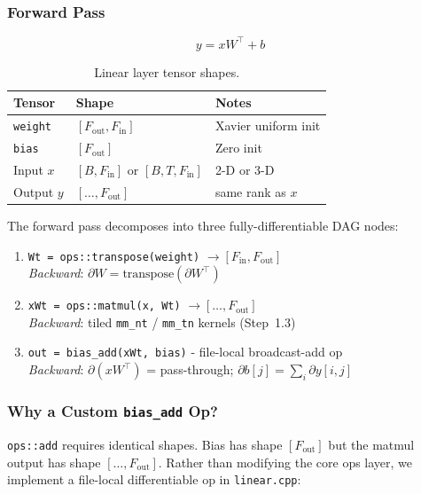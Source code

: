 \documentclass[12pt, a4paper]{article}
\begin{document}
\subsubsection{Forward Pass}

\[
  y = x W^{\top} + b
\]

\begin{table}[!ht]
\centering
\renewcommand{\arraystretch}{1.35}
\begin{tabularx}{\textwidth}{@{} l l L @{}}
\toprule
\textbf{Tensor} & \textbf{Shape} & \textbf{Notes} \\
\midrule
\texttt{weight} & \([F_{\text{out}}, F_{\text{in}}]\)  & Xavier uniform init \\
\texttt{bias}   & \([F_{\text{out}}]\)                  & Zero init \\
Input \(x\)     & \([B, F_{\text{in}}]\) or \([B,T,F_{\text{in}}]\) & 2-D or 3-D \\
Output \(y\)    & \([\ldots, F_{\text{out}}]\)          & same rank as \(x\) \\
\bottomrule
\end{tabularx}
\caption{Linear layer tensor shapes.}
\end{table}

The forward pass decomposes into three fully-differentiable DAG nodes:

\begin{enumerate}
  \item \texttt{Wt = ops::transpose(weight)} \(\rightarrow [F_{\text{in}}, F_{\text{out}}]\) \\
        \textit{Backward}: \(\partial W = \text{transpose}(\partial W^{\top})\)
  \item \texttt{xWt = ops::matmul(x, Wt)} \(\rightarrow [\ldots, F_{\text{out}}]\) \\
        \textit{Backward}: tiled \texttt{mm\_nt} / \texttt{mm\_tn} kernels (Step~1.3)
  \item \texttt{out = bias\_add(xWt, bias)} - file-local broadcast-add op \\
        \textit{Backward}: \(\partial(xW^{\top})\) = pass-through; \quad
        \(\partial b[j] = \sum_i \partial y[i,j]\)
\end{enumerate}

\subsubsection{Why a Custom \texttt{bias\_add} Op?}

\texttt{ops::add} requires identical shapes.  Bias has shape \([F_{\text{out}}]\)
but the matmul output has shape \([\ldots, F_{\text{out}}]\).  Rather than
modifying the core ops layer, we implement a file-local differentiable op in
\texttt{linear.cpp}:
\end{document}
